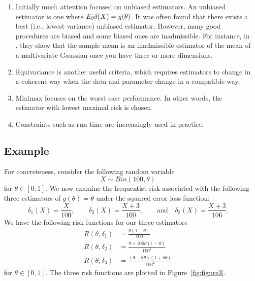 \documentclass[twoside]{article}
\begin{document}
\begin{enumerate}
\item Initially much attention focused on unbiased estimators. An
  unbiased estimator is one where $E_{\theta}\delta(X) = g(\theta)$. It
  was often found that there exists a best (i.e., lowest variance) unbiased
  estimator.  However, many good procedures are biased and some biased
  ones are inadmissible.  For instance, in \cite{stein1956inadmissibility},
  they show that the sample mean is an inadmissible
  estimator of the mean of a multivariate Gaussian once you have three or
  more dimensions.
\item Equivariance is another useful criteria, which requires estimators
  to change in a coherent way when the data and parameter change in a
  compatible way.
\item Minimax focuses on the worst case performance.  In other words, the estimator
   with lowest maximal risk is chosen.
\item Constraints such as run time are increasingly used in practice.
\end{enumerate}


\subsection{Example}

For concreteness, consider \citep[Example 3.1, p.~40-41]{keener} the following
random variable
\begin{equation*}
X \sim Bin(100, \theta)
\end{equation*}
for $\theta \in [0,1]$.  We now examine the frequentist risk associated with
the following three estimators of $g(\theta) = \theta$ under the squared error
loss function:
\begin{equation*}
\delta_1(X) = \frac{X}{100}, \qquad \delta_2(X) = \frac{X+3}{100},
              \qquad \text{and} \quad \delta_3(X) = \frac{X+3}{106}.
\end{equation*}
We have the following risk functions for our three estimators
\begin{align*}
R(\theta, \delta_1) &= \frac{\theta(1-\theta)}{100}\\
R(\theta, \delta_2) &= \frac{9+100 \theta(1-\theta)}{100^2}\\
R(\theta, \delta_3) &= \frac{(9-8\theta)(1+8\theta)}{106^2}
\end{align*}
for $\theta \in [0,1]$.  The three risk functions are plotted in
Figure~\ref{fig:figure3}. 
\end{document}
